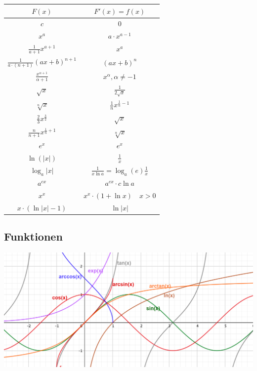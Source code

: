\renewcommand\arraystretch{1.6}
\begin{center}
    \begin{tabular}{c|c}
        $F(x)$ & $F'(x) = f(x)$ \\
        \hline
            
        $ c $ & $ 0 $ \\
	    $ x^a $ & $ a \cdot x^{a - 1} $ \\
        $ \frac{1}{a+1} x^{a+1} $ & $ x^a $ \\
        $ \frac{1}{a\cdot(n+1)} (ax+b)^{n+1} $ & $ (ax+b)^n $ \\
	    $ \frac{x^{\alpha+1}}{\alpha + 1} $ & $ x^\alpha, \alpha \neq -1 $ \\
        $ \sqrt x $ & $ \frac{1}{2 \sqrt x} $ \\
        $ \sqrt[n] x $ & $ \frac{1}{n} {x}^{ \frac{1}{n} -1 } $ \\
        $ \frac{2}{3} x^{ \frac{3}{2} } $ & $ \sqrt x $ \\
        $ \frac{n}{n+1} x^{ \frac{1}{n}+1 } $ & $ \sqrt[n] x $ \\
	    $ e^x $ & $ e^x $ \\
	    $ \ln(|x|) $ & $ \frac{1}{x} $ \\
        $ \log_a |x| $  &  $ \frac{1}{x \ln a} = \log_a(e) \frac{1}{x} $ \\
        $ a^{cx} $ & $ a^{cx} \cdot c \ln a $ \\
        $ x^x $ & $ x^x \cdot (1+\ln x) \quad \scriptstyle x > 0 $ \\
        $ x \cdot (\ln |x| - 1) $  &  $ \ln |x| $ \\
    \end{tabular}
\end{center}
\renewcommand{\arraystretch}{1}


\subsection{Funktionen}

\begin{center}
	\includegraphics[width=\linewidth]{assets/funktionen.png}
\end{center}
